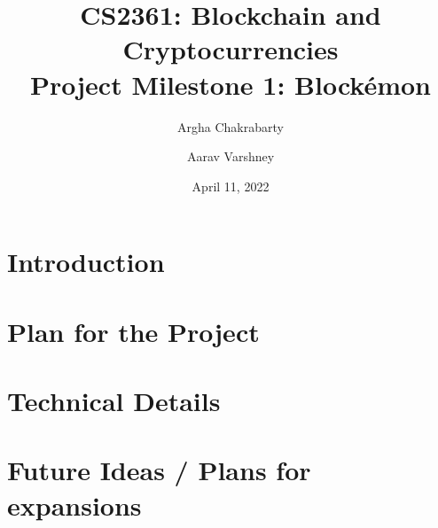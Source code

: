 \documentclass[]{article}   %
\begin{document}
\title{CS2361: Blockchain and Cryptocurrencies\\ Project Milestone 1: Blockémon}   %
\author{Argha Chakrabarty \and Aarav Varshney}         %
\date{April 11, 2022}    %
\maketitle

\section*{Introduction}
\newpage
\section*{Plan for the Project}
\newpage
\section*{Technical Details}
\newpage
\section*{Future Ideas / Plans for expansions}


\nocite{*}


\end{document}
